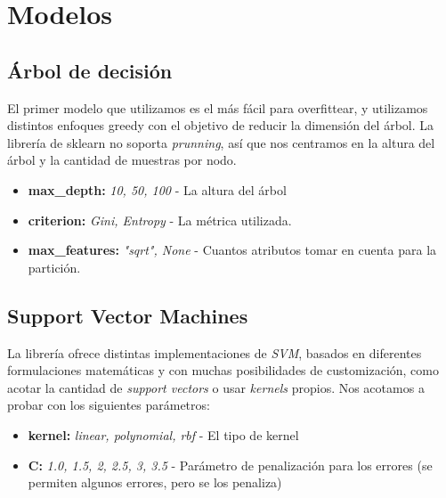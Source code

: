 \section{Modelos}

\subsection{Árbol de decisión}
El primer modelo que utilizamos es el más fácil para overfittear, y utilizamos distintos enfoques greedy con el objetivo de
reducir la dimensión del árbol. La librería de sklearn no soporta \textit{prunning}, así que nos centramos en la altura del árbol
y la cantidad de muestras por nodo.
\begin{itemize}
\item \textbf{max\_depth:} \textit{10, 50, 100} - La altura del árbol
\item \textbf{criterion:} \textit{Gini, Entropy} - La métrica utilizada.
\item \textbf{max\_features:} \textit{"sqrt", None} - Cuantos atributos tomar en cuenta para la partición.
\end{itemize}



\subsection{Support Vector Machines}
La librería ofrece distintas implementaciones de \textit{SVM}, basados en diferentes formulaciones matemáticas y
con muchas posibilidades de customización, como acotar la cantidad de \textit{support vectors} o usar \textit{kernels} propios.
Nos acotamos a probar con los siguientes parámetros:
\begin{itemize}
\item \textbf{kernel:} \textit{linear, polynomial, rbf} - El tipo de kernel
\item \textbf{C:} \textit{1.0, 1.5, 2, 2.5, 3, 3.5} - Parámetro de penalización para los errores (se permiten algunos errores, pero se los penaliza)
\end{itemize}


